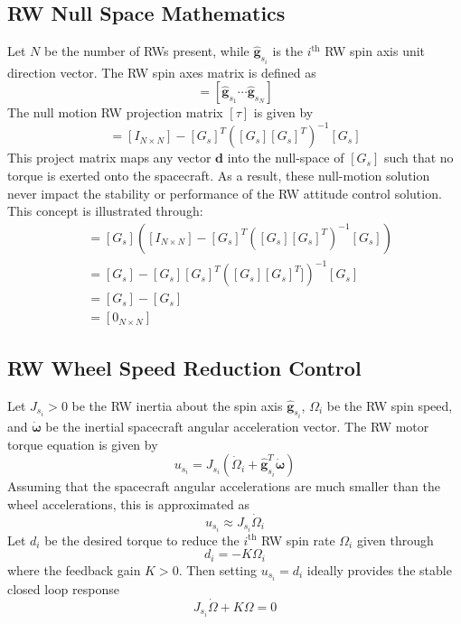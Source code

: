 \subsection{RW Null Space Mathematics}
Let $N$ be the number of RWs present, while $\hat{\bm g}_{s_{i}}$ is the $i^{\text{th}}$ RW spin axis unit direction vector.  The RW spin axes matrix is defined as
\begin{equation}
	[G_{s}] = [\hat{\bm g}_{s_{1}} \cdots \hat{\bm g}_{s_{N}}]
\end{equation}
The null motion RW projection matrix $[\tau]$ is given by\cite{schaub}
\begin{equation}
	[\tau] = [I_{N\times N}] - [G_{s}]^{T} \left( [G_{s}] [G_{s}]^{T} \right)^{-1} [G_{s}]
\end{equation}
This project matrix maps any vector $\bm d$ into the null-space of $[G_{s}]$ such that no torque is exerted onto the spacecraft.  As a result, these null-motion solution never impact the stability or performance of the RW attitude control solution.  This concept is illustrated through:
\begin{align*}
	[G_{s}] [\tau] &= [G_{s}] \left( [I_{N\times N}] - [G_{s}]^{T} \left( [G_{s}] [G_{s}]^{T} \right)^{-1} [G_{s}] \right)
	\\
	&= [G_{s}] - [G_{s}] [G_{s}]^{T} \left( [G_{s}] [G_{s}]^{T}] \right)^{-1} [G_{s}] \\
	&= [G_{s}] - [G_{s}] \\
	&= [0_{N\times N}]
\end{align*}


\subsection{RW Wheel Speed Reduction Control}
Let $J_{s_{i}}>0$ be the RW inertia about the spin axis $\hat{\bm g}_{s_{i}}$, $\Omega_{i}$ be the RW spin speed, and $\dot{\bm \omega}$ be the inertial spacecraft angular acceleration vector.  The RW motor torque equation is given by\cite{schaub}
\begin{equation}
	u_{s_{i}} = J_{s_{i}} (\dot\Omega_{i} + \hat{\bm g}_{s_{i}}^{T} \dot{\bm \omega} )
\end{equation}
Assuming that the spacecraft angular accelerations are much smaller than the wheel accelerations, this is approximated as
\begin{equation}
	u_{s_{i}} \approx J_{s_{i}} \dot\Omega_{i}
\end{equation}
Let $d_{i}$ be the desired torque to reduce the $i^{\text{th}}$ RW spin rate $\Omega_{i}$ given through
\begin{equation}
	d_{i} = - K \Omega_{i}
\end{equation}
where the feedback gain $K>0$.  Then setting $u_{s_{i}} = d_{i}$ ideally provides the stable closed loop response
\begin{equation}
	J_{s_{i}} \dot\Omega + K\Omega = 0
\end{equation}



